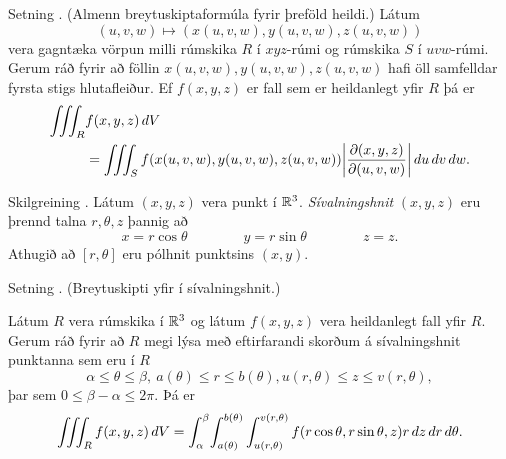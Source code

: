 \begin{frame}{} 

\begin {block}{Setning \kaflanr. (Almenn breytuskiptaformúla fyrir þreföld heildi.) }
 Látum 
$$(u,v,w)\mapsto (x(u,v,w), y(u,v,w), z(u,v,w))$$
vera gagntæka vörpun milli rúmskika $R$ í $xyz$-rúmi og rúmskika $S$ í $uvw$-rúmi.  Gerum ráð fyrir að föllin $x(u,v,w), y(u,v,w), z(u,v,w)$ hafi öll samfelldar fyrsta stigs hlutafleiður.  Ef $f(x,y,z)$ er fall sem er heildanlegt yfir $R$ þá er
\begin {align*}
\thrint_R& f(x,y,z)\,dV \\&=\thrint_S f(x(u,v,w), y(u,v,w), z(u,v,w))
\bigg|\frac{\partial(x,y,z)}{\partial(u,v,w)}\bigg|\,du\,dv\,dw.
\end {align*}
\end{block}

\end{frame}

\begin{frame}{} 

\begin {block}{Skilgreining \kaflanr.}
 Látum $(x,y,z)$ vera punkt í ${\mathbb R}^3$.  {\em Sívalningshnit} $(x,y,z)$ eru þrennd talna $r, \theta, z$ þannig að 
$$x=r\cos\theta\qquad\qquad y=r\sin\theta\qquad\qquad z=z.$$
Athugið að $[r,\theta]$ eru pólhnit punktsins $(x,y)$. 
\end{block}

\end{frame}

\begin{frame}{} 

\begin {block}{Setning \kaflanr. (Breytuskipti yfir í sívalningshnit.)}

Látum $R$ vera rúmskika í ${\mathbb R}^3$ og látum $f(x,y,z)$ vera heildanlegt fall yfir $R$.  Gerum ráð fyrir að $R$ megi lýsa með eftirfarandi skorðum á sívalningshnit punktanna sem eru í $R$
$$\alpha\leq \theta\leq \beta,\ a(\theta)\leq r\leq  b(\theta), u(r,\theta)\leq z\leq v(r,\theta),$$ 
þar sem $0\leq \beta-\alpha\leq 2\pi$.  Þá er
$$\int\!\!\!\int\!\!\!\int_R f(x,y,z)\,dV= 
\int_\alpha^\beta
\!\int_{a(\theta)}^{b(\theta)}\int_{u(r,\theta)}^{v(r,\theta)}      
f(r\cos\theta,r\sin\theta,z)r\,dz\,dr\,d\theta.$$
 
\end{block}

\end{frame}

